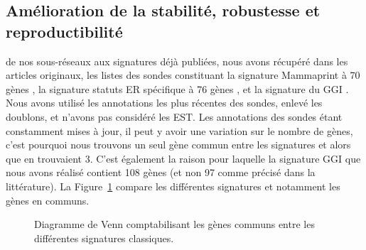 		\subsection{\textcolor{blue!45!black}{Amélioration de la stabilité, robustesse et reproductibilité}}
			 de nos sous-réseaux aux signatures déjà publiées, nous avons récupéré dans les articles originaux, les listes des sondes constituant la signature Mammaprint à 70 gènes \citep{vandevijver2002}, la signature statuts ER spécifique à 76 gènes \citep{Wang2005}, et la signature du \acs{GGI} \citep{Sotiriou2006}. Nous avons utilisé les annotations les plus récentes des sondes, enlevé les doublons, et n'avons pas considéré les EST. Les annotations des sondes étant constamment mises à jour, il peut y avoir une variation sur le nombre de gènes, c'est pourquoi nous trouvons un seul gène commun entre les signatures \citet{vandevijver2002} et \citet{Wang2005} alors que \citet{Chuang2007} en trouvaient 3. C'est également la raison pour laquelle la signature GGI \citep{Sotiriou2006} que nous avons réalisé contient 108 gènes (et non 97 comme précisé dans la littérature).
			La Figure~\ref{fig:Venn} compare les différentes signatures et notamment les gènes en communs.
			\begin{figure}
				\caption{Diagramme de Venn comptabilisant les gènes communs entre les différentes signatures classiques.}\label{fig:Venn}
				\begin{center}
				\end{center}
			\end{figure}

